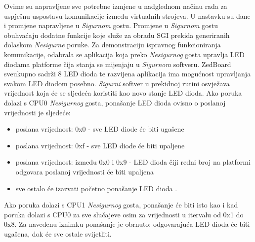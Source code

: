 \documentclass[times, utf8, diplomski, numeric]{fer}
\begin{document}
Ovime su napravljene sve potrebne izmjene u nadglednom načinu rada za uspješnu uspostavu komunikacije između virtualnih
strojeva. U nastavku su dane i promjene napravljene u \textit{Sigurnom} gostu. Promjene u \textit{Sigurnom} gostu
obuhvaćaju dodatne funkcije koje služe za obradu SGI prekida generiranih dolaskom \textit{Nesigurne} poruke. Za
demonstraciju ispravnog funkcioniranja komunikacije, odabrala se aplikacija koja preko \textit{Nesigurnog} gosta upravlja
LED diodama platforme čija stanja se mijenjaju u \textit{Sigurnom} softveru. ZedBoard sveukupno sadrži 8 LED dioda te
razvijena aplikacija ima mogućnost upravljanja svakom LED diodom posebno. \textit{Sigurni} softver u prekidnoj rutini
osvježava vrijednost koja će se sljedeća koristiti kao novo stanje LED dioda. Ako poruka dolazi s CPU0 \textit{Nesigurnog}
gosta, ponašanje LED dioda ovisno o poslanoj vrijednosti je sljedeće:
\begin{itemize}
  \item{poslana vrijednost: 0x0 - sve LED diode će biti ugašene}
  \item{poslana vrijednost: 0xf - sve LED diode će biti upaljene}
  \item{poslana vrijednost: između 0x0 i 0x9 - LED dioda čiji redni broj na platformi odgovara poslanoj vrijednosti će biti
  upaljena}
  \item{sve ostalo će izazvati početno ponašanje LED dioda .}
\end{itemize}
Ako poruka dolazi s CPU1 \textit{Nesigurnog} gosta, ponašanje će biti isto kao i kad poruka dolazi s CPU0 za sve slučajeve
osim za vrijednosti u itervalu od 0x1 do 0x8. Za navedenu iznimku ponašanje je obrnuto: odgovarajuća LED dioda će biti
ugašena, dok će sve ostale svijetliti.
\end{document}
